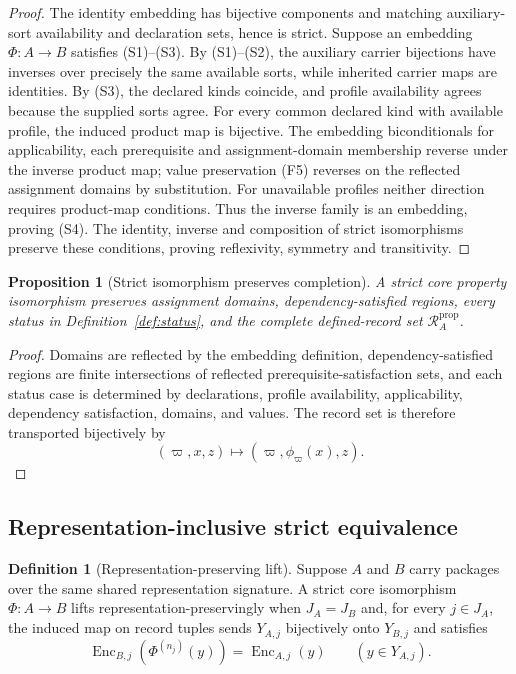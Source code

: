 \documentclass[11pt]{article}
\newcommand{\PropRec}{\mathcal R^{\mathrm{prop}}}
\newcommand{\Enc}{\operatorname{Enc}}
\newtheorem{proposition}[theorem]{Proposition}
\theoremstyle{definition}
\newtheorem{definition}[theorem]{Definition}
\theoremstyle{remark}
\begin{document}
\begin{proof}
The identity embedding has bijective components and matching auxiliary-sort availability and declaration sets, hence is strict.
Suppose an embedding \(\Phi:A\to B\) satisfies (S1)--(S3).
By (S1)--(S2), the auxiliary carrier bijections have inverses over precisely the same available sorts, while inherited carrier maps are identities.
By (S3), the declared kinds coincide, and profile availability agrees because the supplied sorts agree.
For every common declared kind with available profile, the induced product map is bijective.
The embedding biconditionals for applicability, each prerequisite and assignment-domain membership reverse under the inverse product map; value preservation (F5) reverses on the reflected assignment domains by substitution.
For unavailable profiles neither direction requires product-map conditions.
Thus the inverse family is an embedding, proving (S4).
The identity, inverse and composition of strict isomorphisms preserve these conditions, proving reflexivity, symmetry and transitivity.
\end{proof}

\begin{proposition}[Strict isomorphism preserves completion]
A strict core property isomorphism preserves assignment domains, dependency-satisfied regions, every status in Definition~\ref{def:status}, and the complete defined-record set \(\PropRec_A\).
\end{proposition}

\begin{proof}
Domains are reflected by the embedding definition, dependency-satisfied regions are finite intersections of reflected prerequisite-satisfaction sets, and each status case is determined by declarations, profile availability, applicability, dependency satisfaction, domains, and values.
The record set is therefore transported bijectively by
\[
(\varpi,x,z)\longmapsto(\varpi,\phi_{\varpi}(x),z).
\]
\end{proof}

\subsection{Representation-inclusive strict equivalence}

\begin{definition}[Representation-preserving lift]
Suppose \(A\) and \(B\) carry packages over the same shared representation signature.
A strict core isomorphism \(\Phi:A\to B\) lifts representation-preservingly when \(J_A=J_B\) and, for every \(j\in J_A\), the induced map on record tuples sends \(Y_{A,j}\) bijectively onto \(Y_{B,j}\) and satisfies
\[
\Enc_{B,j}(\Phi^{(n_j)}(y))=\Enc_{A,j}(y)
\qquad
(y\in Y_{A,j}).
\]
\end{definition}
\end{document}
